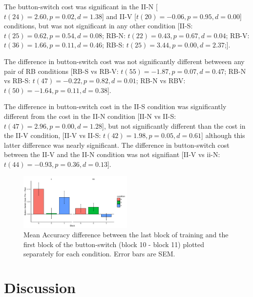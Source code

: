 \documentclass[apacite, draftfirst, jou]{apa6}
\begin{document}
The button-switch cost was significant in the II-N [$t(24) = 2.60, p = 0.02, d =
1.38$] and II-V [$t(20) = -0.06, p = 0.95, d = 0.00$] conditions, but was not
significant in any other condition [II-S: $t(25) = 0.62, p = 0.54, d = 0.08$;
RB-N: $t(22) = 0.43, p = 0.67, d = 0.04$; RB-V: $t(36) = 1.66, p = 0.11, d =
0.46$; RB-S: $t(25) = 3.44, p = 0.00, d = 2.37$;].

The difference in button-switch cost was not significantly different betweeen
any pair of RB conditions [RB-S vs RB-V: $t(55) = -1.87, p = 0.07, d = 0.47$;
RB-N vs RB-S: $t(47) = -0.22, p = 0.82, d = 0.01$; RB-N vs RBV: $t(50) = -1.64,
p = 0.11, d = 0.38$].

The difference in button-switch cost in the II-S condition was significantly
different from the cost in the II-N condition [II-N vs II-S: $t(47) = 2.96, p =
0.00, d = 1.28$], but not significantly different than the cost in the II-V
condition, [II-V vs II-S: $t(42) = 1.98, p = 0.05, d = 0.61$] although this
latter difference was nearly significant. The difference in button-switch cost
between the II-V and the II-N condition was not signifiant [II-V vs ii-N: $t(44)
= -0.93, p = 0.36, d = 0.13$].

\begin{figure}[h]
  \centering
  \includegraphics[width=0.5\textwidth]{../figs/bs_cost.pdf}
  \caption{Mean Accuracy difference between the last block of training and the
    first block of the button-switch (block 10 - block 11) plotted separately for
    each condition. Error bars are SEM.}
  \label{bs_cost}
\end{figure}

\section{Discussion}
\end{document}
